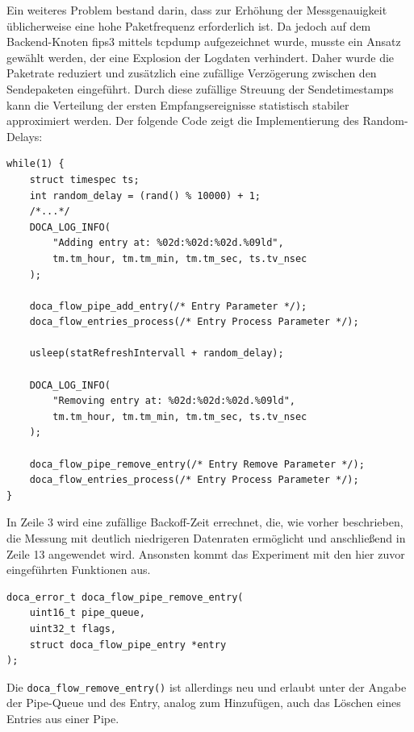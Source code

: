 \documentclass[paper=a4, fontsize=11pt]{scrartcl} %
\numberwithin{equation}{section} %
\numberwithin{figure}{section} %
\numberwithin{table}{section} %
\begin{document}
Ein weiteres Problem bestand darin, dass zur Erhöhung der Messgenauigkeit üblicherweise eine hohe Paketfrequenz erforderlich ist. Da jedoch auf dem Backend-Knoten fips3 mittels tcpdump aufgezeichnet wurde, musste ein Ansatz gewählt werden, der eine Explosion der Logdaten verhindert. Daher wurde die Paketrate reduziert und zusätzlich eine zufällige Verzögerung zwischen den Sendepaketen eingeführt. Durch diese zufällige Streuung der Sendetimestamps kann die Verteilung der ersten Empfangsereignisse statistisch stabiler approximiert werden. Der folgende Code zeigt die Implementierung des Random-Delays:
\begin{verbatim}
while(1) {
    struct timespec ts;
    int random_delay = (rand() % 10000) + 1;
    /*...*/
    DOCA_LOG_INFO(
        "Adding entry at: %02d:%02d:%02d.%09ld", 
        tm.tm_hour, tm.tm_min, tm.tm_sec, ts.tv_nsec
    );

    doca_flow_pipe_add_entry(/* Entry Parameter */);
    doca_flow_entries_process(/* Entry Process Parameter */);

    usleep(statRefreshIntervall + random_delay);

    DOCA_LOG_INFO(
        "Removing entry at: %02d:%02d:%02d.%09ld", 
        tm.tm_hour, tm.tm_min, tm.tm_sec, ts.tv_nsec
    );
    
    doca_flow_pipe_remove_entry(/* Entry Remove Parameter */);
    doca_flow_entries_process(/* Entry Process Parameter */);
}
\end{verbatim}
In Zeile 3 wird eine zufällige Backoff-Zeit errechnet, die, wie vorher beschrieben, die Messung mit deutlich niedrigeren Datenraten ermöglicht und anschließend in Zeile 13 angewendet wird. Ansonsten kommt das Experiment mit den hier zuvor eingeführten Funktionen aus.  \begin{verbatim}
doca_error_t doca_flow_pipe_remove_entry(
    uint16_t pipe_queue, 
    uint32_t flags, 
    struct doca_flow_pipe_entry *entry
);
\end{verbatim}
Die \texttt{doca\_flow\_remove\_entry()} ist allerdings neu und erlaubt unter der Angabe der Pipe-Queue und des Entry, analog zum Hinzufügen, auch das Löschen eines Entries aus einer Pipe.
\end{document}
